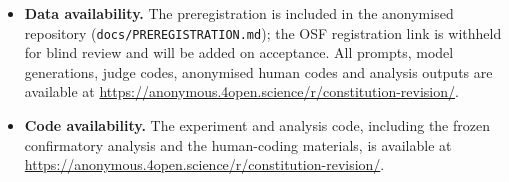 \begin{itemize}
\item \textbf{Data availability.} The preregistration is included in the anonymised repository (\texttt{docs/PREREGISTRATION.md}); the OSF registration link is withheld for blind review and will be added on acceptance. All prompts, model generations, judge codes, anonymised human codes and analysis outputs are available at \url{https://anonymous.4open.science/r/constitution-revision/}.
\item \textbf{Code availability.} The experiment and analysis code, including the frozen confirmatory analysis and the human-coding materials, is available at \url{https://anonymous.4open.science/r/constitution-revision/}.
\end{itemize}
